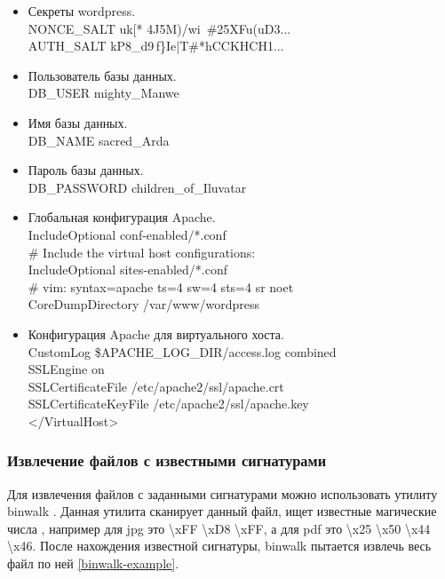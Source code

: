 \documentclass[20pt]{article}
\begin{document}
\begin{itemize}
  \item Секреты wordpress.\\
  NONCE\_SALT uk[* 4J5M)/wi~\#25XFu(uD3...\\
  AUTH\_SALT kP8\_d9\,f\}Ie|T\#*hCCKHCH1...
  \item Пользователь базы данных.\\
  DB\_USER mighty\_Manwe
  \item Имя базы данных.\\
  DB\_NAME sacred\_Arda
  \item Пароль базы данных.\\
  DB\_PASSWORD children\_of\_Iluvatar
  \item Глобальная конфигурация Apache.\\
  IncludeOptional conf-enabled/*.conf\\
  \# Include the virtual host configurations:\\
  IncludeOptional sites-enabled/*.conf\\
  \# vim: syntax=apache ts=4 sw=4 sts=4 sr noet\\
  CoreDumpDirectory /var/www/wordpress
  \item Конфигурация Apache для виртуального хоста.\\
  CustomLog \${APACHE\_LOG\_DIR}/access.log combined\\
  SSLEngine on\\
  SSLCertificateFile /etc/apache2/ssl/apache.crt\\
  SSLCertificateKeyFile /etc/apache2/ssl/apache.key\\
  </VirtualHost>
\end{itemize}

\subsubsection{Извлечение файлов с известными сигнатурами}

Для извлечения файлов с заданными сигнатурами можно использовать утилиту
binwalk \cite{binwalk}. Данная утилита сканирует данный файл, ищет известные
магические числа \cite{signatures}, например для jpg это \textbackslash xFF
\textbackslash xD8 \textbackslash xFF, а для pdf это \textbackslash x25
\textbackslash x50 \textbackslash x44 \textbackslash x46. После нахождения
известной сигнатуры, binwalk пытается извлечь весь файл по ней \ref{binwalk-example}.
\end{document}
